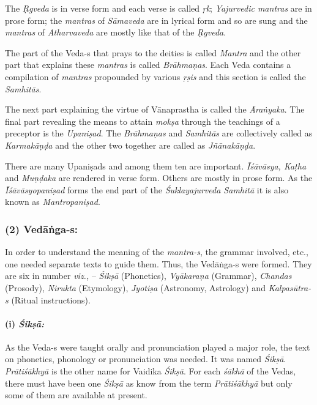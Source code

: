The \textit{Ṛgveda} is in verse form and each verse is called \textit{ṛk}; \textit{Yajurvedic mantras} are in prose form; the \textit{mantras} of \textit{Sāmaveda} are in lyrical form and so are sung and the \textit{mantras} of \textit{Atharvaveda} are mostly like that of the \textit{Ṛgveda}.

The part of the Veda-s that prays to the deities is called \textit{Mantra} and the other part that explains these \textit{mantras} is called \textit{Brāhmaṇas}. Each Veda contains a compilation of \textit{mantras} propounded by various \textit{ṛṣis} and this section is called the \textit{Samhitās}.

The next part explaining the virtue of Vānaprastha is called the \textit{Āraṅyaka}. The final part revealing the means to attain \textit{mokṣa} through the teachings of a preceptor is the \textit{Upaniṣad}. The \textit{Brāhmaṇas} and \textit{Samhitās} are collectively called as \textit{Karmakāṇḍa} and the other two together are called as \textit{Jñānakāṇḍa}.

There are many Upaniṣads and among them ten are important. \textit{Īśāvāsya, Kaṭha} and \textit{Muṇḍaka} are rendered in verse form. Others are mostly in prose form. As the \textit{Īśāvāsyopaniṣad} forms the end part of the \textit{Śuklayajurveda Samhitā} it is also known as \textit{Mantropaniṣad}.


\subsubsection*{(2) Vedāṅga-s:}

In order to understand the meaning of the \textit{mantra-s}, the grammar involved, etc., one needed separate texts to guide them. Thus, the Vedāṅga-s were formed. They are six in number \textit{viz.,} – \textit{Śikṣā} (Phonetics), \textit{Vyākaraṇa} (Grammar), \textit{Chandas} (Prosody), \textit{Nirukta} (Etymology), \textit{Jyotiṣa} (Astronomy, Astrology) and \textit{Kalpasūtra-s} (Ritual instructions).

\paragraph*{(i) \textit{Śikṣā:}}

As the Veda-s were taught orally and pronunciation played a major role, the text on phonetics, phonology or pronunciation was needed. It was named \textit{Śikṣā}. \textit{Prātiśākhyā} is the other name for Vaidika \textit{Śikṣā}. For each \textit{śākhā} of the Vedas, there must have been one \textit{Śikṣā} as know from the term \textit{Prātiśākhyā} but only some of them are available at present.

